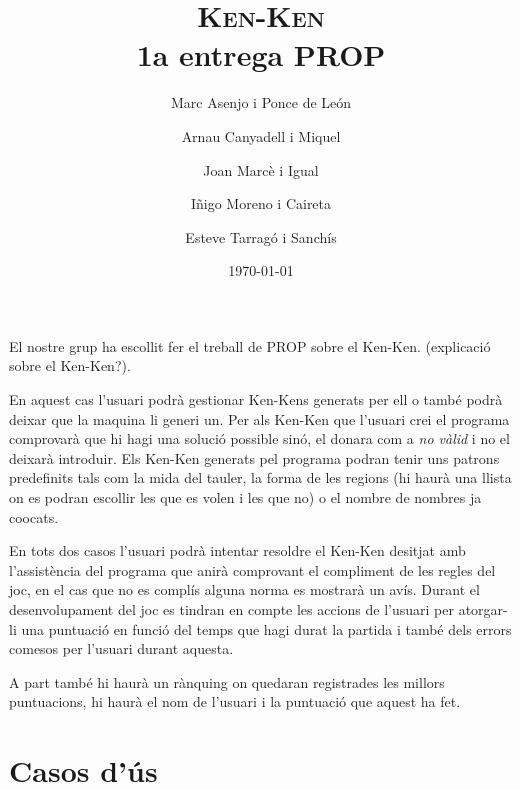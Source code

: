 \documentclass[a4paper,12pt]{article}
\begin{document}
\title{\textsc{Ken-Ken} \\ \large 1a entrega PROP}
\author{Marc Asenjo i Ponce de León \and
	Arnau Canyadell i Miquel \and
	Joan Marcè i Igual \and
	Iñigo Moreno i Caireta \and
	Esteve Tarragó i Sanchís}

\date{\today}
\maketitle

El nostre grup ha escollit fer el treball de PROP sobre el Ken-Ken. (explicació
sobre el Ken-Ken?). 

En aquest cas l'usuari podrà gestionar Ken-Kens generats per ell o també podrà
deixar que la maquina li generi un. 
Per als Ken-Ken que l'usuari crei el programa comprovarà que hi hagi una solució
possible sinó, el donara com a \emph{no vàlid} i no el deixarà introduir. Els Ken-Ken generats 
pel programa podran tenir uns patrons predefinits tals com la mida del tauler, la forma de les 
regions (hi haurà una llista on es podran escollir les que es volen i les que no) o el nombre 
de nombres ja co\lgem ocats.

En tots dos casos l'usuari podrà intentar resoldre el Ken-Ken desitjat amb
l'assistència del programa que anirà comprovant el compliment de les regles del
joc, en el cas que no es complís alguna norma es mostrarà un avís. Durant el
desenvolupament del joc es tindran en compte les accions de l'usuari per
atorgar-li una puntuació en funció del temps que hagi durat la partida
i també dels errors comesos per l'usuari durant aquesta.

A part també hi haurà un rànquing on quedaran registrades les millors puntuacions,
hi haurà el nom de l'usuari i la puntuació que aquest ha fet.

\section{Casos d'ús}
\end{document}
